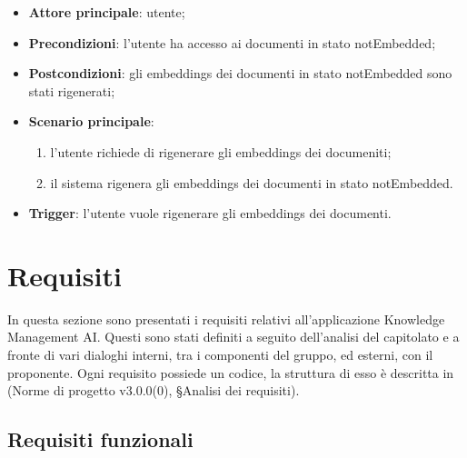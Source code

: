 \documentclass[10pt, a4paper]{article}
\begin{document}
    \begin{itemize}
        \item \textbf{Attore principale}: utente;
        \item \textbf{Precondizioni}: l'utente ha accesso ai documenti in stato notEmbedded;           
        \item \textbf{Postcondizioni}: gli embeddings dei documenti in stato notEmbedded sono stati rigenerati;     
        \item \textbf{Scenario principale}: 
            \begin{enumerate}
                \item l'utente richiede di rigenerare gli embeddings dei documeniti;
                \item il sistema rigenera gli embeddings dei documenti in stato notEmbedded.
            \end{enumerate}
        \item \textbf{Trigger}: l'utente vuole rigenerare gli embeddings dei documenti.
    \end{itemize}



\newpage
\section{Requisiti}
In questa sezione sono presentati i requisiti relativi all’applicazione Knowledge Management AI. Questi sono stati definiti a seguito dell’analisi del capitolato e a fronte di vari dialoghi interni, tra i componenti del gruppo, ed esterni, con il proponente. Ogni requisito possiede un codice, la struttura di esso è descritta in (Norme di progetto v3.0.0(0), \S Analisi dei requisiti).

\subsection{Requisiti funzionali}
\end{document}
